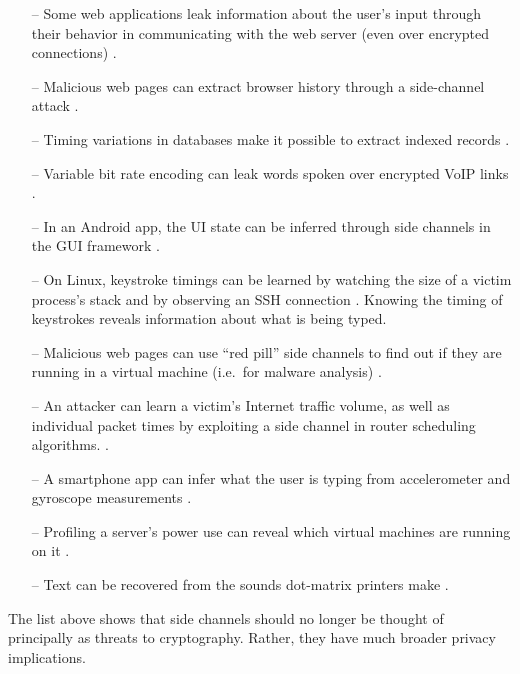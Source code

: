 \documentclass[letterpaper,twocolumn,10pt]{article}
\begin{document}
\begin{itemize}
    \item[--] Some web applications leak information about the user's input through
          their behavior in communicating with the web server (even over
          encrypted connections) \cite{bortz2007exposing, chen2010side}.
    \item[--] Malicious web pages can extract browser history through a side-channel attack
          \cite{weinberg2011still}. 
    \item[--] Timing variations in databases make it possible to extract
          indexed records \cite{futoransky2007nd2db}.
    \item[--] Variable bit rate encoding can leak words spoken over encrypted
        VoIP links \cite{white2011phonotactic}.
    \item[--] In an Android app, the UI state can be inferred through side channels
          in the GUI framework \cite{chen2014peeking}.
    \item[--] On Linux, keystroke timings can be learned by watching the size of
          a victim process's stack \cite{zhang2009peeping} and by observing an
          SSH connection \cite{song2001timing}. Knowing the timing of keystrokes
          reveals information about what is being typed.
    \item[--] Malicious web pages can use ``red pill'' side channels to find out if
          they are running in a virtual machine (i.e.\ for malware analysis)
          \cite{ho2014tick}.
    \item[--] An attacker can learn a victim's Internet traffic volume, as well as
          individual packet times by exploiting a side channel in router
          scheduling algorithms. \cite{kadloor2010low}.
    \item[--] A smartphone app can infer what the user is typing from accelerometer
          and gyroscope measurements \cite{owusu2012accessory,
          cai2012practicality}.
    \item[--] Profiling a server's power use can reveal which virtual machines
        are running on it \cite{hlavacs2011energy}.
    \item[--] Text can be recovered from the sounds dot-matrix printers make
          \cite{backes2010acoustic}.
\end{itemize}

The list above shows that side channels should no longer be thought of
principally as threats to cryptography. Rather, they have much broader privacy
implications.
\end{document}
